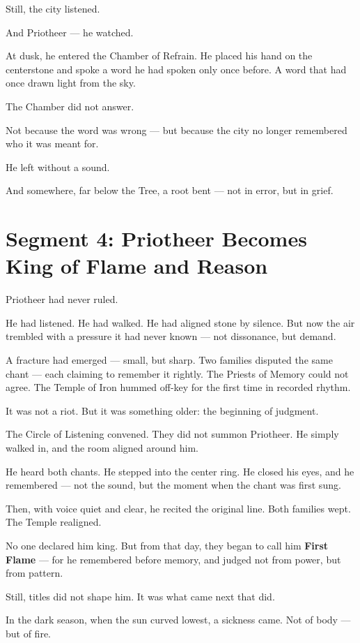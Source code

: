\documentclass[10pt]{article}
\begin{document}
Still, the city listened.

And Priotheer —  
he watched.

At dusk, he entered the Chamber of Refrain.  
He placed his hand on the centerstone and spoke a word he had spoken only once before.  
A word that had once drawn light from the sky.

The Chamber did not answer.

Not because the word was wrong —  
but because the city no longer remembered who it was meant for.

He left without a sound.

And somewhere, far below the Tree,  
a root bent — not in error,  
but in grief.

\newpage

\section*{Segment 4: Priotheer Becomes King of Flame and Reason}

Priotheer had never ruled.

He had listened. He had walked. He had aligned stone by silence.  
But now the air trembled with a pressure it had never known — not dissonance, but demand.

A fracture had emerged — small, but sharp.  
Two families disputed the same chant — each claiming to remember it rightly.  
The Priests of Memory could not agree.  
The Temple of Iron hummed off-key for the first time in recorded rhythm.

It was not a riot.  
But it was something older: the beginning of judgment.

The Circle of Listening convened.  
They did not summon Priotheer.  
He simply walked in, and the room aligned around him.

He heard both chants.  
He stepped into the center ring.  
He closed his eyes, and he remembered — not the sound, but the moment when the chant was first sung.

Then, with voice quiet and clear, he recited the original line.  
Both families wept.  
The Temple realigned.

No one declared him king.  
But from that day, they began to call him \textbf{First Flame} —  
for he remembered before memory,  
and judged not from power, but from pattern.

Still, titles did not shape him.  
It was what came next that did.

In the dark season, when the sun curved lowest, a sickness came.  
Not of body — but of fire.
\end{document}
